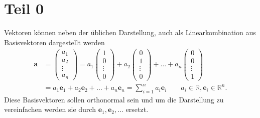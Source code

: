\section{Teil 0\label{clifford:section:Vektoroperationen}}
Vektoren können neben der üblichen Darstellung, auch als Linearkombination aus Basisvektoren dargestellt werden
\begin{equation}
    \begin{split}
    \textbf{a} 
    &=
    \begin{pmatrix} 
    a_1 \\ a_2 \\ \vdots \\ a_n   
    \end{pmatrix} 
    =
    a_1 \begin{pmatrix}
    1 \\ 0 \\ \vdots \\ 0  
    \end{pmatrix} 
    + 
    a_2\begin{pmatrix} 
    0 \\ 1 \\ \vdots \\ 0  
    \end{pmatrix} + \dots 
    + 
    a_n\begin{pmatrix}
    0 \\ 0 \\ \vdots \\ 1  
    \end{pmatrix} \\\ 
    &= 
    a_1\textbf{e}_1 
    +
    a_2\textbf{e}_2
    + 
    \dots + a_n\textbf{e}_n
    = 
    \sum_{i=1}^{n} a_i \textbf{e}_i
    \qquad
    a_i \in \mathbb{R}
    , \textbf{e}_i \in \mathbb{R}^n.
    \end{split}
\end{equation}
Diese Basisvektoren sollen orthonormal sein und um die Darstellung zu vereinfachen werden sie durch $\textbf{e}_1 , \textbf{e}_2, ...$ ersetzt.
